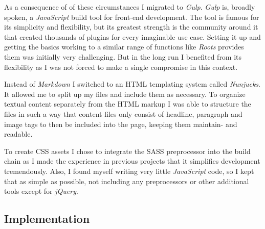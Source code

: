 As a consequence of of these circumstances I migrated to \textit{Gulp}. \textit{Gulp} is, broadly spoken, a \textit{JavaScript} build tool for front-end development. The tool is famous for its simplicity and flexibility, but its greatest strength is the community around it that created thousands of plugins for every imaginable use case. Setting it up and getting the basics working to a similar range of functions like \textit{Roots} provides them was initially very challenging. But in the long run I benefited from its flexibility as I was not forced to make a single compromise in this context.

Instead of \textit{Markdown} I switched to an \ac{HTML} templating system called \textit{Nunjucks}. It allowed me to split up my files and include them as necessary. To organize textual content separately from the \ac{HTML} markup I was able to structure the files in such a way that content files only consist of headline, paragraph and image tags to then be included into the page, keeping them maintain- and readable.

To create \ac{CSS} assets I chose to integrate the \ac{SASS} preprocessor into the build chain as I made the experience in previous projects that it simplifies development tremendously. Also, I found myself writing very little \textit{JavaScript} code, so I kept that as simple as possible, not including any preprocessors or other additional tools except for \textit{jQuery}.

\subsection{Implementation}


